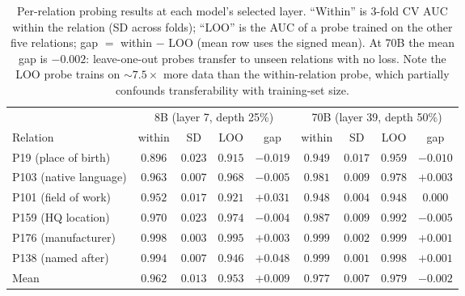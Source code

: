 
\begin{table}[t]
  \centering
  \small
  \begin{tabular}{lcccccccc}
    \toprule
    & \multicolumn{4}{c}{8B (layer 7, depth 25\%)} &
      \multicolumn{4}{c}{70B (layer 39, depth 50\%)} \\
    \cmidrule(lr){2-5} \cmidrule(l){6-9}
    Relation & within & SD & LOO & gap & within & SD & LOO & gap \\
    \midrule
    P19 (place of birth)    & $0.896$ & $0.023$ & $0.915$ & $-0.019$ & $0.949$ & $0.017$ & $0.959$ & $-0.010$ \\
    P103 (native language)  & $0.963$ & $0.007$ & $0.968$ & $-0.005$ & $0.981$ & $0.009$ & $0.978$ & $+0.003$ \\
    P101 (field of work)    & $0.952$ & $0.017$ & $0.921$ & $+0.031$ & $0.948$ & $0.004$ & $0.948$ & $0.000$ \\
    P159 (HQ location)      & $0.970$ & $0.023$ & $0.974$ & $-0.004$ & $0.987$ & $0.009$ & $0.992$ & $-0.005$ \\
    P176 (manufacturer)     & $0.998$ & $0.003$ & $0.995$ & $+0.003$ & $0.999$ & $0.002$ & $0.999$ & $+0.001$ \\
    P138 (named after)      & $0.994$ & $0.007$ & $0.946$ & $+0.048$ & $0.999$ & $0.001$ & $0.998$ & $+0.001$ \\
    \midrule
    Mean                    & $0.962$ & $0.013$ & $0.953$ & $+0.009$ & $0.977$ & $0.007$ & $0.979$ & $-0.002$ \\
    \bottomrule
  \end{tabular}
  \caption{Per-relation probing results at each model's selected layer.
  ``Within'' is 3-fold CV AUC within the relation (SD across folds);
  ``LOO'' is the AUC of a probe trained on the other five relations;
  gap $=$ within $-$ LOO (mean row uses the signed mean). At 70B the
  mean gap is $-0.002$: leave-one-out probes transfer to unseen
  relations with no loss. Note the LOO probe trains on $\sim 7.5\times$
  more data than the within-relation probe, which partially confounds
  transferability with training-set size.}
  \label{tab:relations}
\end{table}
